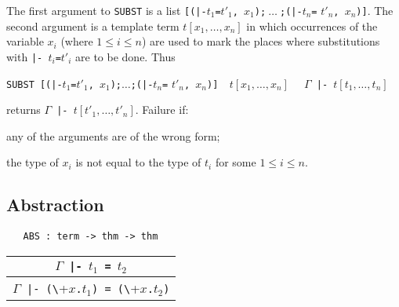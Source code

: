 \noindent
The first argument to {\small\verb+SUBST+} is a list
{\small\verb+[(|-+}$t_1${\small\verb+=+}$t'_1${\small\verb+, +}$x_1${\small\verb+);+}$\:\ldots\:${\small\verb+;(|-+}$t_n${\small\verb+=+}
$t'_n${\small\verb+, +}$x_n${\small\verb+)]+}.  The second argument is a
template term $t[x_1,\ldots,x_n]$ in which occurrences of the variable
$x_i$ (where $1 \leq i\leq n$) are used to mark the places where
substitutions with {\small\verb+|- +}$t_i${\small\verb+=+}$t'_i$ are to be
done. Thus

\bigskip

{\small\verb+SUBST [(|-+}$t_1${\small\verb+=+}$t'_1${\small\verb+, +}$x_1${\small\verb+);+}$\ldots${\small\verb+;(|-+}$t_n${\small\verb+=+}
$t'_n${\small\verb+, +}$x_n${\small\verb+)]  +}$t[x_1,\ldots,x_n]${\small\verb+  +}
$\Gamma${\small\verb+ |- +}$t[t_1,\ldots,t_n]$

\bigskip

\noindent returns $\Gamma${\small\verb+ |- +}$t[t'_1,\ldots,t'_n]$.
Failure if:
\begin{myenumerate}
\item any of the arguments are of the wrong form;
\item the type of $x_i$ is not equal to the type of $t_i$ for some
$1\leq i\leq n$.
\end{myenumerate}

\subsection{Abstraction}


\begin{holboxed}
\begin{verbatim}
   ABS : term -> thm -> thm
\end{verbatim}\end{holboxed}


\begin{center}
\begin{tabular}{c}
$\Gamma${\small\verb+ |- +}$t_1${\small\verb+ = +}$t_2$ \\ \hline
$\Gamma${\small\verb+ |- (\+}$x${\small\verb+.+}$t_1${\small\verb+) = (\+}$x${\small\verb+.+}$t_2${\small\verb+)+} \\
\end{tabular}
\end{center}

